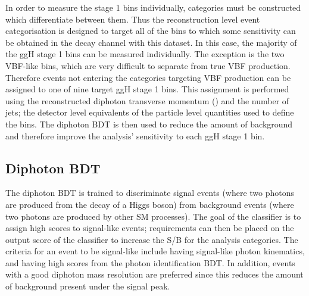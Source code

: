 In order to measure the stage 1 bins individually, 
categories must be constructed which differentiate between them.
Thus the reconstruction level event categorisation is designed to target all of the bins 
to which some sensitivity can be obtained in the \Hgg decay channel with this dataset.
In this case, the majority of the ggH stage 1 bins can be measured individually. 
The exception is the two VBF-like bins, 
which are very difficult to separate from true VBF production.
Therefore events not entering the categories targeting VBF production 
can be assigned to one of nine target ggH stage 1 bins.
This assignment is performed using the reconstructed 
diphoton transverse momentum (\ptgg) and the number of jets; 
the detector level equivalents of the particle level quantities used to define the bins.
The diphoton BDT is then used to reduce the amount of background 
and therefore improve the analysis' sensitivity to each ggH stage 1 bin.

\subsection{Diphoton BDT}

The diphoton BDT is trained to discriminate signal events 
(where two photons are produced from the decay of a Higgs boson) from background events 
(where two photons are produced by other SM processes).
The goal of the classifier is to assign high scores to signal-like events;
requirements can then be placed on the output score of the classifier 
to increase the S/B for the analysis categories.
The criteria for an event to be signal-like include having signal-like photon kinematics, 
and having high scores from the photon identification BDT.
In addition, events with a good diphoton mass resolution are preferred 
since this reduces the amount of background present under the signal peak.

